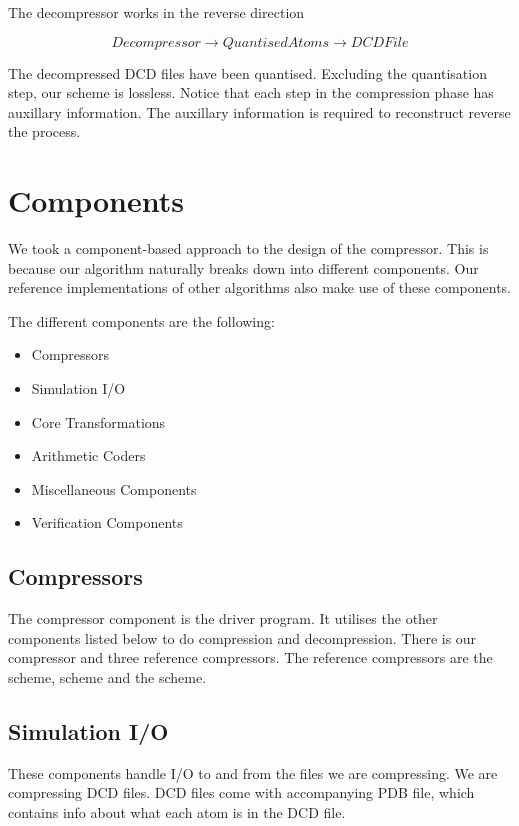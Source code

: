 \documentclass{report}
\begin{document}
The decompressor works in the reverse direction

\[ Decompressor \to QuantisedAtoms \to DCDFile \]

The decompressed DCD files have been quantised. Excluding the quantisation
step, our scheme is lossless. Notice that each step in the compression phase
has auxillary information. The auxillary information is required to
reconstruct reverse the process.


\section{Components}

We took a component-based approach to the design of the compressor. This is
because our algorithm naturally breaks down into different components. Our
reference implementations of other algorithms also make use of these
components.

The different components are the following:
\begin{itemize}
\item Compressors
\item Simulation I/O
\item Core Transformations
\item Arithmetic Coders
\item Miscellaneous Components
\item Verification Components
\end{itemize}

\subsection{Compressors}

The compressor component is the driver program. It utilises the other
components listed below to do compression and decompression. There is our
compressor and three reference compressors. The reference compressors are the
\citet{omeltchenko2000sls} scheme, \cite{gumholdcomp} scheme and the
\citet{devillers2000gci} scheme.


\subsection{Simulation I/O}

These components handle I/O to and from the files we are compressing. We are
compressing DCD files. DCD files come with accompanying PDB file, which
contains info about what each atom is in the DCD file.
\end{document}
